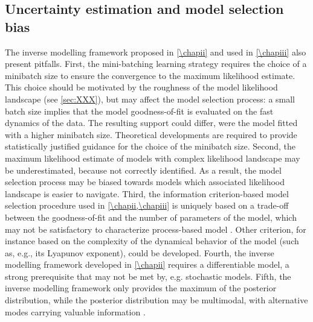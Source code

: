 \subsection{Uncertainty estimation and model selection bias}
The inverse modelling framework proposed in \cref{\chapii} and used in \cref{\chapiii} also present pitfalls.
%
First, the mini-batching learning strategy requires the choice of a minibatch size to ensure the convergence to the maximum likelihood estimate. This choice should be motivated by the roughness of the model likelihood landscape (see \cref{sec:XXX}), but may affect the model selection process:
a small batch size implies that the model goodness-of-fit is evaluated on the fast dynamics of the data. The resulting support could differ, were the model fitted with a higher minibatch size. Theoretical developments are required to provide statistically justified guidance for the choice of the minibatch size. 
% 
Second, the maximum likelihood estimate of models with complex likelihood landscape may be underestimated, because not correctly identified. As a result, the model selection process may be biased towards models which associated likelihood landscape is easier to navigate. 
% 
Third, the information criterion-based model selection procedure used in \cref{\chapii,\chapiii} is uniquely based on a trade-off between the goodness-of-fit and the number of parameters of the model, which may not be satisfactory to characterize process-based model \citep{Clermont2015}. 
% 
Other criterion, for instance based on the complexity of the dynamical behavior of the model (such as, e.g., its Lyapunov exponent), could be developed.
% 
Fourth, the inverse modelling framework developed in \cref{\chapii} requires a differentiable model, a strong prerequisite that may not be met by, e.g. stochastic models. 
% 
Fifth, the inverse modelling framework only provides the maximum of the posterior distribution, while the posterior distribution may be multimodal, with alternative modes carrying valuable information \citep{Daniels2015}.%

